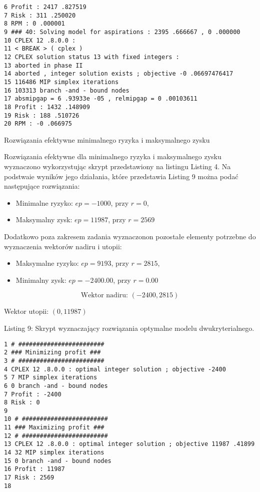 \documentclass{article}
\begin{document}
\begin{verbatim}
6 Profit : 2417 .827519
7 Risk : 311 .250020
8 RPM : 0 .000001
9 ### 40: Solving model for aspirations : 2395 .666667 , 0 .000000
10 CPLEX 12 .8.0.0 :
11 < BREAK > ( cplex )
12 CPLEX solution status 13 with fixed integers :
13 aborted in phase II
14 aborted , integer solution exists ; objective -0 .06697476417
15 116486 MIP simplex iterations
16 103313 branch -and - bound nodes
17 absmipgap = 6 .93933e -05 , relmipgap = 0 .00103611
18 Profit : 1432 .148909
19 Risk : 188 .510726
20 RPM : -0 .066975
\end{verbatim}

Rozwiązania efektywne minimalnego ryzyka i maksymalnego zysku

Rozwiązania efektywne dla minimalnego ryzyka i maksymalnego zysku wyznaczono wykorzystując skrypt przedstawiony na listingu Listing 4. Na podstwaie wyników jego działania, które przedstawia Listing 9 można podać następujące rozwiązania:

\begin{itemize}
\item Minimalne ryzyko: $ep = -1000$, przy $r = 0$,
\item Maksymalny zysk: $ep = 11987$, przy $r = 2569$
\end{itemize}

Dodatkowo poza zakresem zadania wyznaczonon pozostałe elementy potrzebne do wyznaczenia wektorów nadiru i utopii:

\begin{itemize}
\item Maksymalne ryzyko: $ep = 9193$, przy $r = 2815$,
\item Minimalny zysk: $ep = -2400.00$, przy $r = 0.00$
\end{itemize}

$$\text{Wektor nadiru: } (-2400, 2815)$$

Wektor utopii: $(0, 11987)$

Listing 9: Skrypt wyznaczający rozwiązania optymalne modelu dwukryterialnego.

\begin{verbatim}
1 # ########################
2 ### Minimizing profit ###
3 # ########################
4 CPLEX 12 .8.0.0 : optimal integer solution ; objective -2400
5 7 MIP simplex iterations
6 0 branch -and - bound nodes
7 Profit : -2400
8 Risk : 0
9
10 # ########################
11 ### Maximizing profit ###
12 # ########################
13 CPLEX 12 .8.0.0 : optimal integer solution ; objective 11987 .41899
14 32 MIP simplex iterations
15 0 branch -and - bound nodes
16 Profit : 11987
17 Risk : 2569
18
\end{verbatim}
\end{document}
